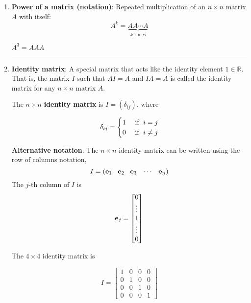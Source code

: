 \begin{enumerate}
\item \textbf{Power of a matrix (notation)}:  Repeated multiplication of an $n \times n$ matrix $A$ with itself:
\[  A^k = \underbrace{AA \cdots A}_{\text{$k$ times}} \]


\begin{example} $A^3 = AAA$
\end{example}


\rule[0.01in]{\textwidth}{0.0025in}



\item \textbf{Identity matrix}:  A special matrix that acts like the identity element $1 \in \mathbb{R}$.  That is, the matrix $I$ such that $AI = A$ and $IA=A$ is called the identity matrix for any $n \times n$ matrix $A$.

\begin{definition}
The $n \times n$ \textbf{identity matrix} is $I = (\delta_{ij})$,  where

\[ 
 \delta_{ij} =  \begin{cases} 	1 & \text{ if \;} i = j\\
						0 & \text{ if \;} i \ne j
			\end{cases}
			\]
\end{definition}



\textbf{Alternative notation}:  The $n \times n$ identity matrix can be written using the row of columns notation, 
$$ I  = ({\bf e}_1 \;\; \;{\bf e}_2 \; \;\; {\bf e}_3 \; \;\; \cdots \; \;\; {\bf e}_n)$$
The $j$-th column of $I$ is $${\bf e}_j = \begin{bmatrix} 0 \\ \vdots \\ 1 \\ \vdots \\   0 \end{bmatrix}$$

\begin{example}
The $4 \times 4$ identity matrix is

\[ I  = \begin{bmatrix} 1 & 0 &  0 &   0  \\ 0 & 1 &  0 &   0  \\ 0 & 0 &  1 &   0  \\ 0 & 0 &  0 &  1  \end{bmatrix} \]
 \end{example}
 

\end{enumerate}
